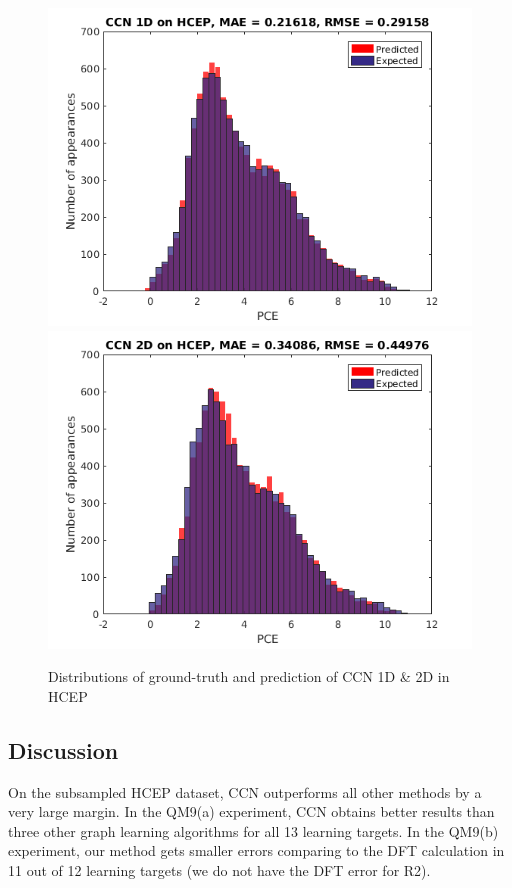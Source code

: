 \documentclass[sigchi]{acmart}
\theoremstyle{definition}
\theoremstyle{theorem}
\theoremstyle{corollary}
\theoremstyle{lemma}
\theoremstyle{remark}
\theoremstyle{prop}
\begin{document}





\begin{figure}
\caption{\label{fig:Result-CCN} Distributions of ground-truth and prediction of CCN 1D \& 2D in HCEP}
\centering
\includegraphics[scale=0.5]{Result_CCN_1D}
\includegraphics[scale=0.5]{Result_CCN_2D}
\end{figure}

\subsection{Discussion}
On the subsampled HCEP dataset, CCN outperforms all other methods by a very large margin. In the QM9(a) experiment, CCN obtains better results than three other graph learning algorithms for all 13 learning targets. In the QM9(b) experiment, our method gets smaller errors comparing to the DFT calculation in 11 out of 12 learning targets (we do not have the DFT error for R2).
\end{document}
